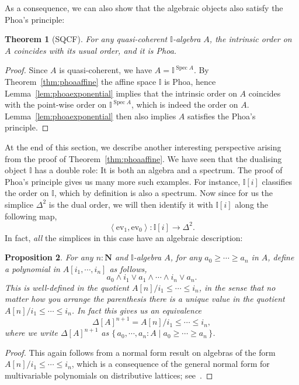 \documentclass[12pt]{amsart}
\newtheorem{theorem}{Theorem}[section]
\newtheorem{proposition}[theorem]{Proposition}
\theoremstyle{definition}
\newcommand{\mb}[1]{\mathbf{#1}}
\newcommand{\mbb}[1]{\mathbb{#1}}
\newcommand{\I}{\mbb I}
\newcommand{\pair}[1]{\left\langle#1\right\rangle}
\newcommand{\ev}{\mathrm{ev}}
\newcommand{\scomp}[2]{\{\,#1\mid#2\,\}}
\newcommand{\N}{\mb N}
\newcommand{\spec}{\operatorname{Spec}}
\begin{document}
As a consequence, we can also show that the algebraic objects also satisfy the Phoa's principle:

\begin{theorem}[SQCF]\label{them:phoaalgebra}
  For any quasi-coherent $\I$-algebra $A$, the intrinsic order on $A$ coincides with its usual order, and it is Phoa.
\end{theorem}
\begin{proof}
  Since $A$ is quasi-coherent, we have $A = \I^{\spec A}$. By Theorem~\ref{thm:phoaaffine} the affine space $\I$ is Phoa, hence Lemma~\ref{lem:phoaexponential} implies that the intrinsic order on $A$ coincides with the point-wise order on $\I^{\spec A}$, which is indeed the order on $A$. Lemma~\ref{lem:phoaexponential} then also implies $A$ satisfies the Phoa's principle.
\end{proof}



At the end of this section, we describe another interesting perspective arising from the proof of Theorem~\ref{thm:phoaaffine}. We have seen that the dualising object $\I$ has a double role: It is both an algebra and a spectrum. The proof of Phoa's principle gives us many more such examples. For instance, $\I[i]$ classifies the order on $\I$, which by definition is also a spectrum. Now since for us the simplice $\Delta^2$ is the dual order, we will then identify it with $\I[i]$ along the following map,
\[ \pair{\ev_1,\ev_0} : \I[i] \to \Delta^2. \]
In fact, \emph{all} the simplices in this case have an algebraic description:

\begin{proposition}\label{prop:simplicesasalgebra}
  For any $n : \N$ and $\I$-algebra $A$, for any $a_0 \ge \cdots \ge a_n$ in $A$, define a polynomial in $A[i_1,\cdots,i_n]$ as follows,
  \[ a_0 \wedge i_1 \vee a_1 \wedge \cdots \wedge i_n \vee a_n. \]
  This is well-defined in the quotient $A[n]/i_1 \le \cdots \le i_n$, in the sense that no matter how you arrange the parenthesis there is a unique value in the quotient $A[n]/i_1 \le \cdots \le i_n$. In fact this gives us an equivalence
  \[ \Delta[A]^{n+1} = A[n]/i_1 \le \cdots \le i_n, \]
  where we write $\Delta[A]^{n+1}$ as $\scomp{a_0,\cdots,a_n : A}{a_0 \ge \cdots \ge a_n}$.
\end{proposition}
\begin{proof}
  This again follows from a normal form result on algebras of the form $A[n]/i_1 \le \cdots \le i_n$, which is a consequence of the general normal form for multivariable polynomials on distributive lattices; see~\cite[Thm. 10.21]{lausch2000algebra}.
\end{proof}
\end{document}
